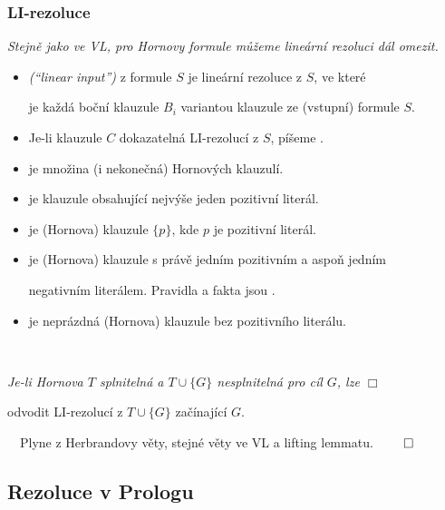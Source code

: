     
    
    
    \subsubsection*{LI-rezoluce}
    {\it Stejně jako ve VL, pro Hornovy formule můžeme lineární rezoluci dál omezit.}
    
    \begin{itemize}
    \item {} \emph{(``linear input'')} z formule $S$ je lineární rezoluce z $S$, ve které
    \vspace{0.5mm}
    
    je každá boční klauzule $B_i$ variantou klauzule ze (vstupní) formule $S$.
    \item Je-li klauzule $C$ dokazatelná LI-rezolucí z $S$, píšeme .
    \smallskip
    
    \item {} je množina (i nekonečná) Hornových klauzulí.
    \item {} je klauzule obsahující nejvýše jeden pozitivní literál.
    \item {} je (Hornova) klauzule $\{p\}$, kde $p$ je pozitivní literál.
    \item {} je (Hornova) klauzule s právě jedním pozitivním a aspoň jedním
    \vspace{0.5mm}
    
    negativním literálem. Pravidla a fakta jsou .
    \item {} je neprázdná (Hornova) klauzule bez pozitivního literálu.
    \end{itemize}
    \smallskip
    
    {\bf {}}\ \ {\it Je-li Hornova $T$ splnitelná a $T\cup \{G\}$ nesplnitelná pro cíl $G$, lze $\Box$
    \smallskip
    
    odvodit LI-rezolucí z $T\cup\{G\}$ začínající $G$.}
    \medskip
    
    {\it {}}\ \ Plyne z Herbrandovy věty, stejné věty ve VL a lifting lemmatu. $\qed$
    
    

\subsection{Rezoluce v Prologu}\todo

